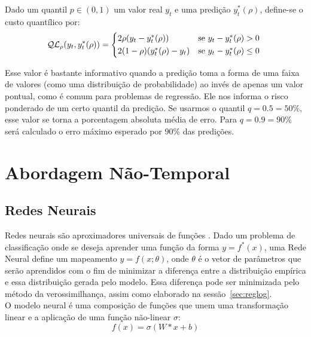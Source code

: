 Dado um quantil $p \in (0,1)$ um valor real $y_{t}$ e uma predição
$y^{*}_{t}(\rho)$, define-se o custo quantílico por: \\

\begin{equation}
  \mathcal{QL}_{\rho}(y_{t},y^{*}_{t}(\rho)) =
\begin{cases*}
  2 \rho(y_{t} - y^{*}_{t}(\rho)) & se $ y_{t} - y^{*}_{t}(\rho) > 0$ \\
  2 (1 - \rho)(y^{*}_{t}(\rho) - y_{t}) & se $y_{t} - y^{*}_{t}(\rho) \leq 0$
\end{cases*}
\end{equation}


Esse valor é bastante informativo quando a predição toma a forma de uma faixa de
valores (como uma distribuição de probabilidade) ao invés de apenas um valor
pontual, como é comum para problemas de regressão. Ele nos informa o risco
ponderado de um certo quantil da predição. Se usarmos o quantil $q=0.5=50\%$,
esse valor se torna a porcentagem absoluta média de erro. Para $q=0.9=90\%$ será
calculado o erro máximo esperado por $90\%$ das predições. 



\section{Abordagem Não-Temporal} 


\subsection{Redes Neurais}

\label{sec:nn}
Redes neurais são aproximadores universais de funções \citep{nnuni}. Dado um problema
de classificação onde se deseja aprender uma função da forma $y = f^*(x)$, uma
Rede Neural define um mapeamento $y = f(x ; \theta)$, onde $\theta$ é o vetor de
parâmetros que serão aprendidos com o fim de minimizar a diferença entre a
distribuição empírica e essa distribuição gerada pelo modelo. Essa diferença pode
ser minimizada pelo método da verossimilhança, assim como elaborado na sessão~\ref{sec:reglog}.\\

O modelo neural é uma composição de funções que unem uma transformação linear e
a aplicação de uma função não-linear $\sigma$: \\

\[ f(x)=  \sigma(W*x + b) \]

